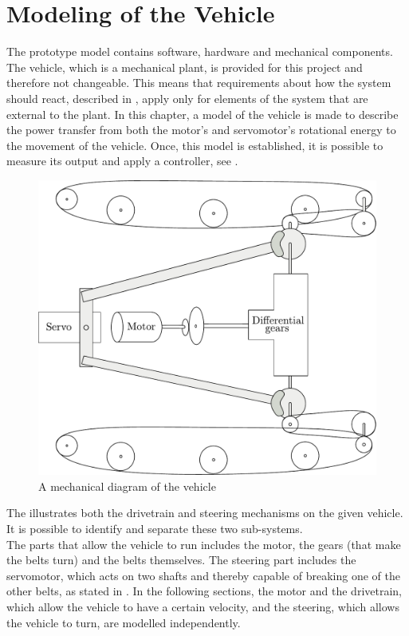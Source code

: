 \chapter{Modeling of the Vehicle}\label{cha:ModelOfVehicle}

The prototype model contains software, hardware and mechanical components. The vehicle, which is a mechanical plant, is provided for this project and therefore not changeable. This means that requirements about how the system should react, described in , apply only for elements of the system that are external to the plant. In this chapter, a model of the vehicle is made to describe the power transfer from both the motor's and servomotor's rotational energy to the movement of the vehicle. Once, this model is established, it is possible to measure its output and apply a controller, see .


\begin{figure}[H]
	\centering
	\includegraphics[width=\textwidth]{figures/completeMechanical.pdf}
	\caption{A mechanical diagram of the vehicle}
	\label{fig:completeMechanicalDiagram}
\end{figure}\vspace{-5mm}

The  illustrates both the drivetrain and steering mechanisms on the given vehicle. It is possible to identify and separate these two sub-systems.\\
The parts that allow the vehicle to run includes the motor, the gears (that make the belts turn) and the belts themselves. The steering part includes the servomotor, which acts on two shafts and thereby capable of breaking one of the other belts, as stated in . In the following sections, the motor and the drivetrain, which allow the vehicle to have a certain velocity, and the steering, which allows the vehicle to turn, are modelled independently.
